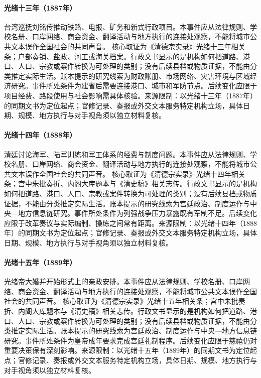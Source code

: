 \hypertarget{civic:EQ-1887-TAIWAN-RAILWAY-PLANNING}{}\paragraph{光绪十三年（1887年）}台湾巡抚刘铭传推动铁路、电报、矿务和新式行政项目。本事件应从法律规则、学校名册、口岸网络、商会资金、翻译活动与地方执行的连接处观察，不能将城市公共文本误作全国社会的共同声音。 核心取证为《清德宗实录》光绪十三年相关条；户部奏销、盐政、河工或海关档案。行政文书显示的是机构如何把道路、港口、人口、宗教或案件转换为可处理的类别；没有后续县档或物质证据，不能由分类推定实际生活。账本提示的研究线索为财政账册、市场网络、灾害环境与区域经济研究。事件所处条件为建省后需要连接港口、城市和军防节点。后续变化应限于项目经费、路段使用与社会影响需具体核验。来源限制：以光绪十三年（1887年）的同期文书为定位起点；官修记录、奏报或外交文本服务特定机构立场，具体日期、规模、地方执行与对手视角须以独立材料复核。
\hypertarget{civic:EQ-1888-NAVAL-AND-ARMY-REFORM}{}\paragraph{光绪十四年（1888年）}清廷讨论海军、陆军训练和军工体系的经费与制度问题。本事件应从法律规则、学校名册、口岸网络、商会资金、翻译活动与地方执行的连接处观察，不能将城市公共文本误作全国社会的共同声音。 核心取证为《清德宗实录》光绪十四年相关条；宫中朱批奏折、内阁大库题本与《清史稿》相关志传。行政文书显示的是机构如何把道路、港口、人口、宗教或案件转换为可处理的类别；没有后续县档或物质证据，不能由分类推定实际生活。账本提示的研究线索为宫廷政治、制度运作与中央—地方信息链研究。事件所处条件为列强战争压力暴露既有军制不足。后续变化应限于改革奏议与实际编制、操练之间常有距离。来源限制：以光绪十四年（1888年）的同期文书为定位起点；官修记录、奏报或外交文本服务特定机构立场，具体日期、规模、地方执行与对手视角须以独立材料复核。
\hypertarget{civic:EQ-1889-GUANGXU-MARRIAGE}{}\paragraph{光绪十五年（1889年）}光绪帝大婚并开始形式上的亲政安排。本事件应从法律规则、学校名册、口岸网络、商会资金、翻译活动与地方执行的连接处观察，不能将城市公共文本误作全国社会的共同声音。 核心取证为《清德宗实录》光绪十五年相关条；宫中朱批奏折、内阁大库题本与《清史稿》相关志传。行政文书显示的是机构如何把道路、港口、人口、宗教或案件转换为可处理的类别；没有后续县档或物质证据，不能由分类推定实际生活。账本提示的研究线索为宫廷政治、制度运作与中央—地方信息链研究。事件所处条件为皇帝成年要求完成宫廷礼制程序。后续变化应限于慈禧仍对重要决策保有深刻影响。来源限制：以光绪十五年（1889年）的同期文书为定位起点；官修记录、奏报或外交文本服务特定机构立场，具体日期、规模、地方执行与对手视角须以独立材料复核。
